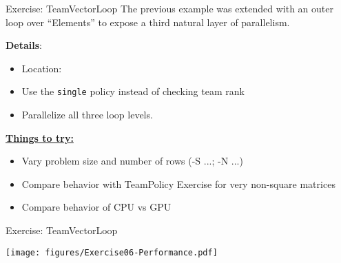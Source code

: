 
\begin{frame}[fragile]{Exercise: TeamVectorLoop}
The previous example was extended with an outer loop over ``Elements'' to expose
a third natural layer of parallelism.

\vspace{10pt}

  \textbf{Details}:
  \begin{small}
  \begin{itemize}
\item Location: 
\item Use the \texttt{single} policy instead of checking team rank
\item Parallelize all three loop levels.
\end{itemize}
  \end{small}

\ul{\textbf{Things to try:}}
  \begin{small}
  \begin{itemize}
  \item Vary problem size and number of rows (-S ...; -N ...)
  \item Compare behavior with TeamPolicy Exercise for very non-square matrices
  \item Compare behavior of CPU vs GPU
  \end{itemize}
  \end{small}
\end{frame}


\begin{frame}[fragile]{Exercise: TeamVectorLoop}


    \texttt{[image: figures/Exercise06-Performance.pdf]}

  \vspace{-15pt}

\end{frame}


